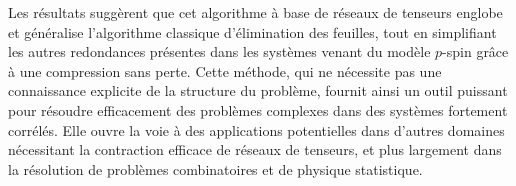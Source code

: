 Les résultats suggèrent que cet algorithme à base de réseaux de tenseurs englobe et généralise l'algorithme classique d'élimination des feuilles, tout en simplifiant les autres redondances présentes dans les systèmes venant du modèle $p$-spin grâce à une compression sans perte.
Cette méthode, qui ne nécessite pas une connaissance explicite de la structure du problème, fournit ainsi un outil puissant pour résoudre efficacement des problèmes complexes dans des systèmes fortement corrélés.
Elle ouvre la voie à des applications potentielles dans d'autres domaines nécessitant la contraction efficace de réseaux de tenseurs, et plus largement dans la résolution de problèmes combinatoires et de physique statistique.
